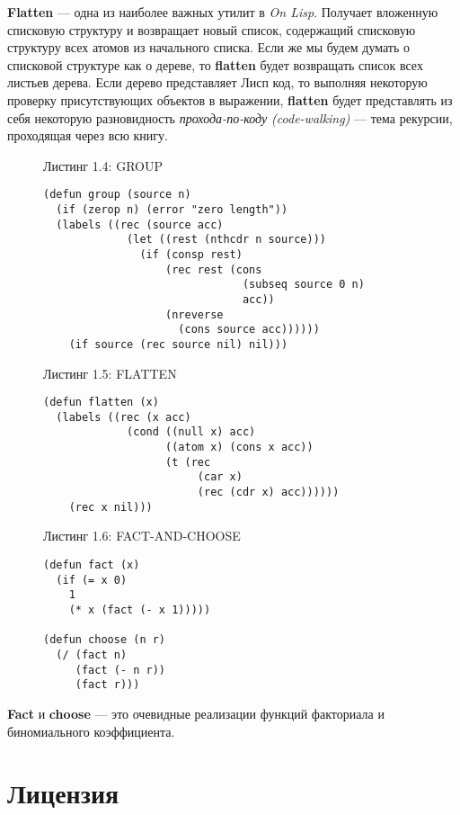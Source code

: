 \textbf{Flatten} --- одна из наиболее важных утилит в \emph{On Lisp}. Получает вложенную списковую структуру и возвращает новый список, содержащий списковую структуру всех атомов из начального списка. Если же мы будем думать о списковой структуре как о дереве, то \textbf{flatten} будет возвращать список всех листьев дерева. Если дерево представляет Лисп код, то выполняя некоторую проверку присутствующих объектов в выражении, \textbf{flatten} будет представлять из себя некоторую разновидность \emph{прохода-по-коду (code-walking)} --- тема рекурсии, проходящая через всю книгу.

\begin{figure}Листинг 1.4: GROUP\label{listing_1.4}
\listbegin
\begin{verbatim}
(defun group (source n)
  (if (zerop n) (error "zero length"))
  (labels ((rec (source acc)
             (let ((rest (nthcdr n source)))
               (if (consp rest)
                   (rec rest (cons
                               (subseq source 0 n)
                               acc))
                   (nreverse
                     (cons source acc))))))
    (if source (rec source nil) nil)))
\end{verbatim}
\listend
\end{figure}

\begin{figure}Листинг 1.5: FLATTEN\label{listing_1.5}
\listbegin
\begin{verbatim}
(defun flatten (x)
  (labels ((rec (x acc)
             (cond ((null x) acc)
                   ((atom x) (cons x acc))
                   (t (rec
                        (car x)
                        (rec (cdr x) acc))))))
    (rec x nil)))
\end{verbatim}
\listend
\end{figure}

\begin{figure}Листинг 1.6: FACT-AND-CHOOSE\label{listing_1.6}
\listbegin
\begin{verbatim}
(defun fact (x)
  (if (= x 0)
    1
    (* x (fact (- x 1)))))

(defun choose (n r)
  (/ (fact n)
     (fact (- n r))
     (fact r)))
\end{verbatim}
\listend
\end{figure}

\textbf{Fact} и \textbf{choose} --- это очевидные реализации функций факториала и биномиального коэффициента.

\section{Лицензия}\label{section_license}

